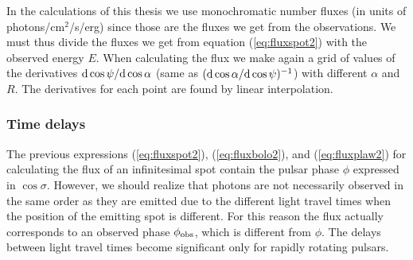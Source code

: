 \documentclass{wihuri}
\def\msun{{\rm M_{\odot}}}
\def\d{{\rm d}}
\def\phiobs{\phi_{\rm obs}}
\begin{document}
In the calculations of this thesis we use monochromatic number fluxes (in units of photons/cm$^{2}$/s/erg) since those are the fluxes we get from the observations. We must thus divide the fluxes we get from equation (\ref{eq:fluxspot2}) with the observed energy $E$. When calculating the flux we make again a grid of values of the derivatives $\d\cos\psi / \d\cos\alpha$ (same as $(\d\cos\alpha / \d\cos\psi)^{-1}$) with different $\alpha$ and $R$. The derivatives for each point are found by linear interpolation. 


\subsubsection{Time delays}



The previous expressions (\ref{eq:fluxspot2}), (\ref{eq:fluxbolo2}), and (\ref{eq:fluxplaw2}) for calculating the flux of an infinitesimal spot
contain the pulsar phase $\phi$ expressed in $\cos\sigma$. However, we should realize that photons are not necessarily observed in the same order as they are emitted due to the different light travel times when the position of the emitting spot is different. For this reason the flux actually corresponds to an observed phase $\phiobs$, which is different from $\phi$. The delays between light travel times become significant only for rapidly rotating pulsars. %

   
\end{document}

